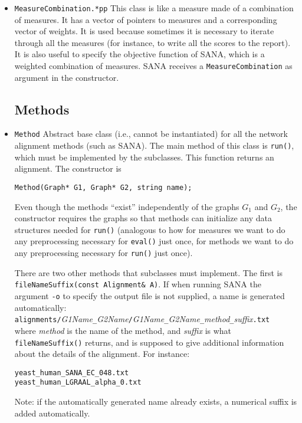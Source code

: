 \documentclass[]{article}
\begin{document}
\begin{itemize}
\item \texttt{MeasureCombination.*pp} This class is like a measure made of a combination of measures. It has a vector of pointers to measures and a corresponding vector of weights. It is used because sometimes it is necessary to iterate through all the measures (for instance, to write all the scores to the report). It is also useful to specify the objective function of SANA, which is a weighted combination of measures. SANA receives a \texttt{MeasureCombination} as argument in the constructor.

\subsection{Methods}\label{methods}

\item \texttt{Method} Abstract base class (i.e., cannot be instantiated) for all the network alignment methods (such as SANA). The main method of this class is \texttt{run()}, which must be implemented by the subclasses. This function returns an alignment. The constructor is
\begin{verbatim}
Method(Graph* G1, Graph* G2, string name);
\end{verbatim}
Even though the methods ``exist'' independently of the graphs $G_1$ and $G_2$, the constructor requires the graphs so that methods can initialize any data structures needed for \texttt{run()} (analogous to how for measures we want to do any preprocessing necessary for \texttt{eval()} just once, for methods we want to do any preprocessing necessary for \texttt{run()} just once).

There are two other methods that subclasses must implement. The first is \texttt{fileNameSuffix(const Alignment\& A)}. If when running SANA the argument \texttt{-o} to specify the output file is not supplied, a name is generated automatically:\\
\texttt{alignments/}\textit{G1Name}\texttt{\_}\textit{G2Name}\texttt{/}\textit{G1Name}\texttt{\_}\textit{G2Name}\texttt{\_}\textit{method}\texttt{\_}\textit{suffix}\texttt{.txt}\\where \textit{method} is the name of the method, and \textit{suffix} is what \texttt{fileNameSuffix()} returns, and is supposed to give additional information about the details of the alignment. For instance:
\begin{verbatim}
yeast_human_SANA_EC_048.txt
yeast_human_LGRAAL_alpha_0.txt
\end{verbatim}
Note: if the automatically generated name already exists, a numerical suffix is added automatically.


\end{itemize}
\end{document}
